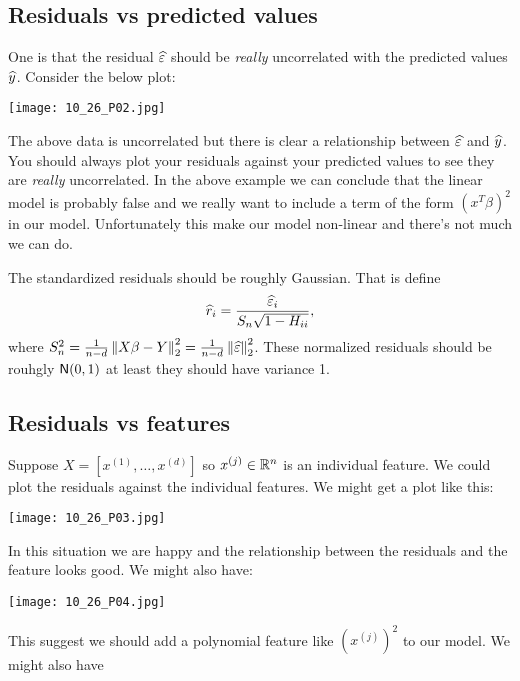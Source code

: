 \subsection{Residuals vs predicted values}
One is that the residual $\widehat{\varepsilon}$ should be \emph{really} uncorrelated with the predicted values $\widehat{y}$. Consider the below plot:

\begin{center}
    \texttt{[image: 10\_26\_P02.jpg]}
\end{center}

The above data is uncorrelated but there is clear a relationship between $\widehat{\varepsilon}$ and $\widehat{y}$. You should always plot your residuals against your predicted values to see they are \emph{really} uncorrelated. In the above example we can conclude that the linear model is probably false and we really want to include a term of the form $(x^T\beta)^2$ in our model. Unfortunately this make our model non-linear and there's not much we can do.

The standardized residuals should be roughly Gaussian. That is define
\[\widehat{r}_i = \frac{\widehat{\varepsilon}_i}{S_n \sqrt{1-H_{ii}}}, \]
where $S_n^2 = \frac{1}{n-d}\left\|X\beta - Y\right\|_2^2 = \frac{1}{n-d}\left\|\widehat{\varepsilon}\right\|_2^2$. These normalized residuals should be rouhgly ${\mathsf{N}}(0,1)$ at least they should have variance 1. 



\subsection{Residuals vs features}
Suppose $X=[x^{(1)},\ldots, x^{(d)}]$ so $x^{(j)} \in {\mathbb R}^n$ is an individual feature. We could plot the residuals against the individual features.  We might get a plot like this:

\begin{center}
    \texttt{[image: 10\_26\_P03.jpg]}
\end{center}

In this situation we are happy and the relationship between the residuals and the feature looks good. We might also have:

\begin{center}
    \texttt{[image: 10\_26\_P04.jpg]}    
\end{center}

This suggest we should add a polynomial feature like $(x^{(j)})^2$ to our model. We might also have

